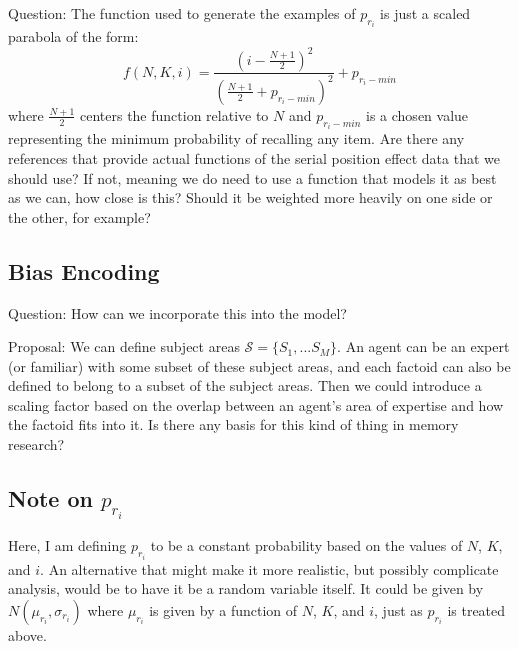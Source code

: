 Question:  The function used to generate the examples of $p_{r_i}$ is just a scaled parabola of the form:
\begin{equation}
    	f(N,K,i) = \frac{(i - \frac{N+1}{2})^2}{(\frac{N+1}{2} + p_{r_i-min})^2} + p_{r_i-min}
\end{equation}
where $\frac{N+1}{2}$ centers the function relative to $N$ and $p_{r_i-min}$ is a chosen value representing the minimum probability of recalling any item.
Are there any references that provide actual functions of the serial position effect data that we should use?  If not, meaning we do need to use a function that models it as best as we can, how close is this?  Should it be weighted more heavily on one side or the other, for example?

\subsection{Bias Encoding}

Question:  How can we incorporate this into the model?  

Proposal:  We can define subject areas $\mathcal{S} = \{S_1, ...S_M\}$.  An agent can be an expert (or familiar) with some subset of these subject areas, and each factoid can also be defined to belong to a subset of the subject areas.  Then we could introduce a scaling factor based on the overlap between an agent's area of expertise and how the factoid fits into it.  Is there any basis for this kind of thing in memory research?

\subsection{Note on $p_{r_i}$}
Here, I am defining $p_{r_i}$ to be a constant probability based on the values of $N$, $K$, and $i$.  An alternative that might make it more realistic, but possibly complicate analysis, would be to have it be a random variable itself.  It could be given by $N(\mu_{r_i}, \sigma_{r_i})$ where $\mu_{r_i}$ is given by a function of $N$, $K$, and $i$, just as $p_{r_i}$ is treated above.  

